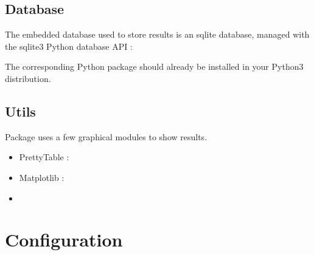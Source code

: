 \documentclass[letterpaper,10pt,english]{sphinxmanual}
\begin{document}
\section{Database}
\label{\detokenize{requirements:database}}
\begin{DUlineblock}{0em}
\item[] The embedded database used to store results is an sqlite database, managed with the sqlite3 Python database API : 
\item[] The corresponding Python package should already be installed in your Python3 distribution.
\end{DUlineblock}


\section{Utils}
\label{\detokenize{requirements:utils}}
Package  uses a few graphical modules to show results.
\begin{itemize}
\item {} 
PrettyTable : 

\item {} 
Matplotlib : 

\item {} 

\end{itemize}


\chapter{Configuration}
\label{\detokenize{configuration:module-loacore.conf}}\label{\detokenize{configuration:configuration}}\label{\detokenize{configuration::doc}}
\end{document}
